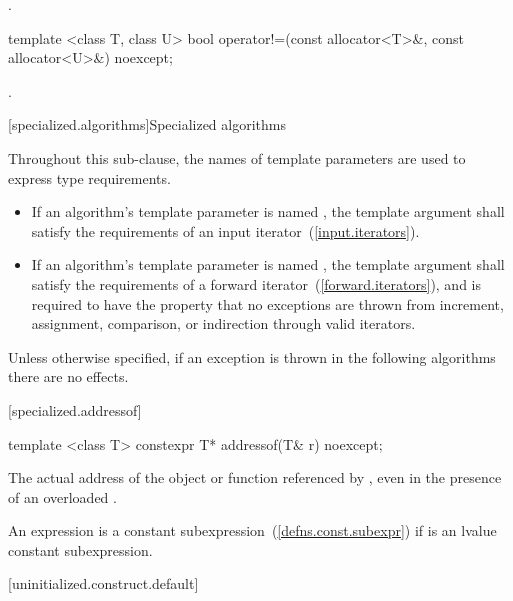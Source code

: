 \begin{itemdescr}
\pnum
\returns
{}.
\end{itemdescr}

%
\begin{itemdecl}
template <class T, class U>
  bool operator!=(const allocator<T>&, const allocator<U>&) noexcept;
\end{itemdecl}

\begin{itemdescr}
\pnum
\returns
{}.
\end{itemdescr}

[specialized.algorithms]{Specialized algorithms}

\pnum
Throughout this sub-clause,
the names of template parameters are used to express type requirements.
\begin{itemize}
\item
If an algorithm's template parameter is named ,
the template argument shall satisfy the requirements
of an input iterator~(\ref{input.iterators}).
\item
If an algorithm's template parameter is named ,
the template argument shall satisfy the requirements
of a forward iterator~(\ref{forward.iterators}), and
is required to have the property that no exceptions are thrown
from increment, assignment, comparison, or indirection through valid iterators.
\end{itemize}
Unless otherwise specified,
if an exception is thrown in the following algorithms there are no effects.

[specialized.addressof]{}

%
\begin{itemdecl}
template <class T> constexpr T* addressof(T& r) noexcept;
\end{itemdecl}

\begin{itemdescr}
\pnum
\returns The actual address of the object or function referenced by , even in the
presence of an overloaded .

\pnum
\remarks An expression 
is a constant subexpression~(\ref{defns.const.subexpr})
if  is an lvalue constant subexpression.
\end{itemdescr}

[uninitialized.construct.default]{}

